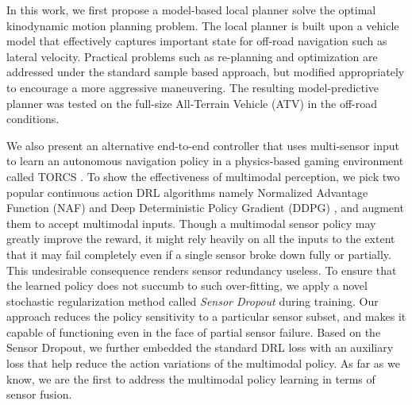 \documentclass[../thesis.tex]{subfiles}
\begin{document}
In this work, we first propose a model-based local planner solve the optimal kinodynamic motion planning problem. 
The local planner is built upon a vehicle model that effectively captures important state for off-road navigation such as lateral velocity. 
Practical problems such as re-planning and optimization are addressed under the standard sample based approach, but modified appropriately to encourage a more aggressive maneuvering. 
The resulting model-predictive planner was tested on the full-size All-Terrain Vehicle (ATV) in the off-road conditions.
 
We also present an alternative end-to-end controller that uses multi-sensor input to learn an autonomous navigation policy in a physics-based gaming environment called TORCS \cite{wymann2000torcs}. 
To show the effectiveness of multimodal perception, we pick two popular continuous action DRL algorithms namely Normalized Advantage Function (NAF) \cite{CDQN} and Deep Deterministic Policy Gradient (DDPG) \cite{DBLP:journals/corr/LillicrapHPHETS15}, and augment them to accept multimodal inputs. 
Though a multimodal sensor policy may greatly improve the reward, it might rely heavily on all the inputs to the extent that it may fail completely even if a single sensor broke down fully or partially. This undesirable consequence renders sensor redundancy useless. 
To ensure that the learned policy does not succumb to such over-fitting, we apply a novel stochastic regularization method called \emph{Sensor Dropout} during training. 
Our approach reduces the policy sensitivity to a particular sensor subset, and makes it capable of functioning even in the face of partial sensor failure. 
Based on the Sensor Dropout, we further embedded the standard DRL loss with an auxiliary loss that help reduce the action variations of the multimodal policy. 
As far as we know, we are the first to address the multimodal policy learning in terms of sensor fusion.
 
 
\end{document}
